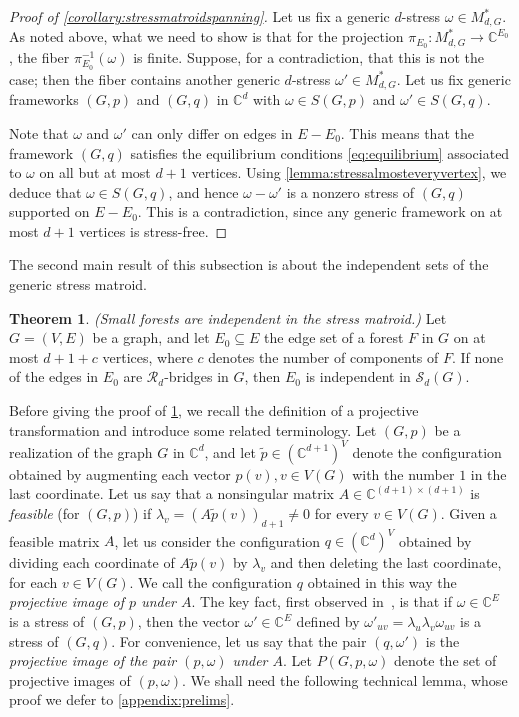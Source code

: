 \documentclass[11pt,a4paper,dvipsnames]{scrartcl}
\theoremstyle{definition}
\newtheorem{theorem}{Theorem}[section]
\newcommand{\CC}{\mathbb{C}}
\newcommand{\stressmatroid}[2]{\mathcal{S}_{#1}(#2)}
\begin{document}
\begin{proof}[Proof of \cref{corollary:stressmatroidspanning}]
    Let us fix a generic $d$-stress $\omega \in M^*_{d,G}$. As noted above, what we need to show is that for the projection $\pi_{E_0} : M^*_{d,G} \to \CC^{E_0}$, the fiber $\pi^{-1}_{E_0}(\omega)$ is finite. Suppose, for a contradiction, that this is not the case; then the fiber contains another generic $d$-stress $\omega' \in M^*_{d,G}$. Let us fix generic frameworks $(G,p)$ and $(G,q)$ in $\CC^d$ with $\omega \in S(G,p)$ and $\omega' \in S(G,q)$.
    
    Note that $\omega$ and $\omega'$ can only differ on edges in $E - E_0$. This means that the framework $(G,q)$ satisfies the equilibrium conditions \cref{eq:equilibrium} associated to $\omega$ on all but at most $d+1$ vertices. Using \cref{lemma:stressalmosteveryvertex}, we deduce that $\omega \in S(G,q)$, and hence $\omega - \omega'$ is a nonzero stress of $(G,q)$ supported on $E - E_0$. This is a contradiction, since any generic framework on at most $d+1$ vertices is stress-free. 
\end{proof}

The second main result of this subsection is about the independent sets of the generic stress matroid.

\begin{theorem}\label{theorem:projectiveimages} \emph{(Small forests are independent in the stress matroid.)}\newline
    Let $G = (V,E)$ be a graph, and let $E_0 \subseteq E$ the edge set of a forest $F$ in $G$ on at most $d+1+c$ vertices, where $c$ denotes the number of components of $F$.
    If none of the edges in $E_0$ are $\mathcal{R}_d$-bridges in $G$, then $E_0$ is independent in $\stressmatroid{d}{G}$.
\end{theorem}

Before giving the proof of \cref{theorem:projectiveimages}, we recall the definition of a projective transformation and introduce some related terminology. Let $(G,p)$ be a realization of the graph $G$ in $\CC^d$, and let $\tilde{p} \in (\CC^{d+1})^V$ denote the configuration obtained by augmenting each vector $p(v), v \in V(G)$ with the number $1$ in the last coordinate. Let us say that a nonsingular matrix $A \in \CC^{(d+1) \times (d+1)}$ is \emph{feasible} (for $(G,p)$) if $\lambda_v = {(A\tilde{p}(v))}_{d+1} \neq 0$ for every $v \in V(G)$. Given a feasible matrix $A$, let us consider the configuration $q \in (\CC^d)^V$ obtained by dividing each coordinate of $A\tilde{p}(v)$ by $\lambda_v$ and then deleting the last coordinate, for each $v \in V(G)$. We call the configuration $q$ obtained in this way the \emph{projective image of $p$ under $A$}. The key fact, first observed in~\cite{roth.whiteley_1981}, is that if $\omega \in \CC^E$ is a stress of $(G,p)$, then the vector $\omega' \in \CC^E$ defined by $\omega'_{uv} = \lambda_u \lambda_v \omega_{uv}$ 
is a stress of $(G,q)$. For convenience, let us say that the pair $(q,\omega')$ is the \emph{projective image of the pair $(p,\omega)$ under $A$}. Let $P(G,p,\omega)$ denote the set of projective images of $(p,\omega)$. We shall need the following technical lemma, whose proof we defer to \cref{appendix:prelims}.
\end{document}
